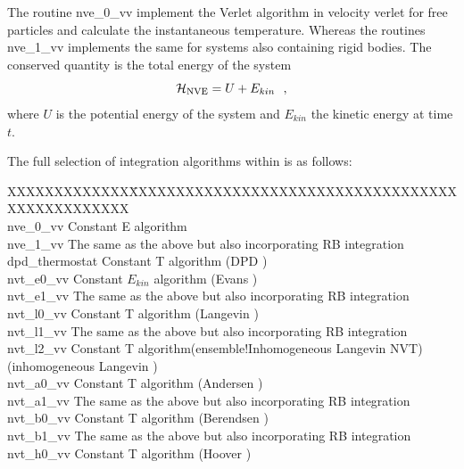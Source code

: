 The routine {\sc nve\_0\_vv} implement the
Verlet algorithm in velocity verlet for free particles and calculate the
instantaneous temperature.  Whereas the routines {\sc nve\_1\_vv} implements the same for systems also containing
rigid bodies.  The conserved quantity is the total energy of the system
\begin{equation}
{\cal H}_{\rm NVE} = U + E_{kin}~~,
\end{equation}
where $U$ is the potential energy of the system and $E_{kin}$ the
kinetic energy at time $t$.

The full selection of integration algorithms within \D is as follows:

\begin{tabbing}
XXXXXXXXXXXXX\=XXXXXXXXXXXXXXXXXXXXXXXXXXXXXXXXXXXXXXXXXXXXXXXX\kill\\
{\sc nve\_0\_vv}       \> Constant E algorithm \\
{\sc nve\_1\_vv}       \> The same as the above but also incorporating RB integration \\
{\sc dpd\_thermostat}  \> Constant T algorithm (DPD \cite{shardlow-03a}) \\
{\sc nvt\_e0\_vv}      \> Constant $E_{kin}$ algorithm (Evans \cite{evans-84a}) \\
{\sc nvt\_e1\_vv}      \> The same as the above but also incorporating RB integration \\
{\sc nvt\_l0\_vv}      \> Constant T algorithm (Langevin \cite{adelman-76a}) \\
{\sc nvt\_l1\_vv}      \> The same as the above but also incorporating RB integration \\
{\sc nvt\_l2\_vv}      \> Constant T algorithm\index(ensemble!Inhomogeneous Langevin NVT) (inhomogeneous Langevin \cite{duffy-07a}) \\
{\sc nvt\_a0\_vv}      \> Constant T algorithm (Andersen \cite{andersen-79a}) \\
{\sc nvt\_a1\_vv}      \> The same as the above but also incorporating RB integration \\
{\sc nvt\_b0\_vv}      \> Constant T algorithm (Berendsen \cite{berendsen-84a}) \\
{\sc nvt\_b1\_vv}      \> The same as the above but also incorporating RB integration \\
{\sc nvt\_h0\_vv}      \> Constant T algorithm (Hoover \cite{hoover-85a}) \\

\end{tabbing}
